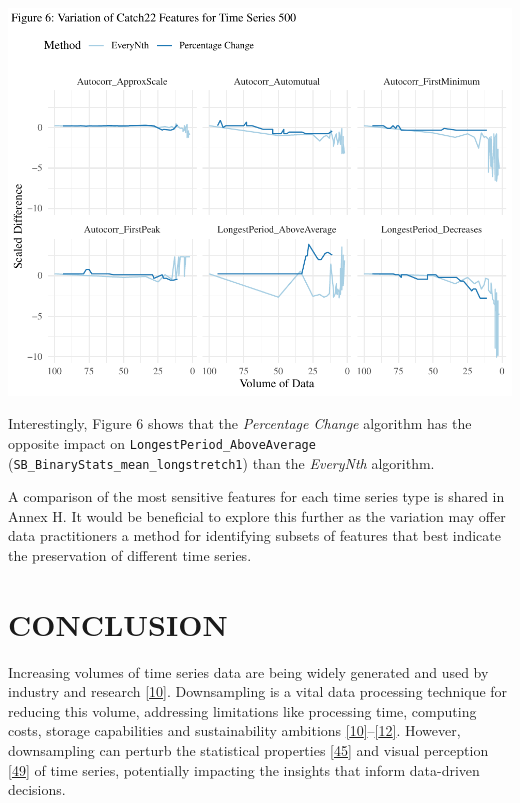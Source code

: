 \documentclass{article}
\begin{document}
\includegraphics{210431461_CSC8639_Dissertation_files/figure-latex/Catch22Variation-1.pdf}

Interestingly, Figure 6 shows that the \emph{Percentage Change}
algorithm has the opposite impact on
\texttt{LongestPeriod\_AboveAverage}
(\texttt{SB\_BinaryStats\_mean\_longstretch1}) than the \emph{EveryNth}
algorithm.

A comparison of the most sensitive features for each time series type is
shared in Annex H. It would be beneficial to explore this further as the
variation may offer data practitioners a method for identifying subsets
of features that best indicate the preservation of different time
series.

\hypertarget{conclusion}{%
\section{CONCLUSION}\label{conclusion}}

Increasing volumes of time series data are being widely generated and
used by industry and research \protect\hyperlink{ref-TVStore}{{[}10{]}}.
Downsampling is a vital data processing technique for reducing this
volume, addressing limitations like processing time, computing costs,
storage capabilities and sustainability ambitions
\protect\hyperlink{ref-TVStore}{{[}10{]}}--\protect\hyperlink{ref-Shift}{{[}12{]}}.
However, downsampling can perturb the statistical properties
\protect\hyperlink{ref-ATIChangePoint}{{[}45{]}} and visual perception
\protect\hyperlink{ref-graphsampling}{{[}49{]}} of time series,
potentially impacting the insights that inform data-driven decisions.
\end{document}
